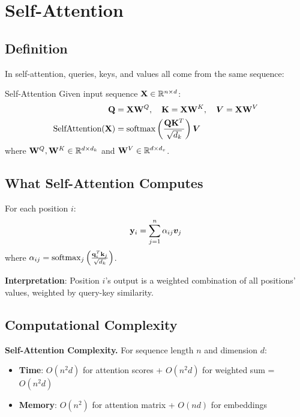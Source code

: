 \section{Self-Attention}
\label{sec:self_attention}

\subsection{Definition}

In self-attention, queries, keys, and values all come from the same sequence:

\begin{mathresult}{Self-Attention}
Given input sequence $\mathbf{X} \in \mathbb{R}^{n \times d}$:
\begin{align}
\mathbf{Q} &= \mathbf{X} \mathbf{W}^Q, \quad \mathbf{K} = \mathbf{X} \mathbf{W}^K, \quad \bm{V} = \mathbf{X} \mathbf{W}^V \\
\text{SelfAttention}(\mathbf{X}) &= \operatorname{softmax}\left(\frac{\mathbf{Q}\mathbf{K}^T}{\sqrt{d_k}}\right)\bm{V}
\end{align}
where $\mathbf{W}^Q, \mathbf{W}^K \in \mathbb{R}^{d \times d_k}$ and $\mathbf{W}^V \in \mathbb{R}^{d \times d_v}$.
\end{mathresult}

\subsection{What Self-Attention Computes}

For each position $i$:
\begin{equation}
\mathbf{y}_i = \sum_{j=1}^n \alpha_{ij} \bm{v}_j
\end{equation}
where $\alpha_{ij} = \operatorname{softmax}_j\left(\frac{\mathbf{q}_i^T \mathbf{k}_j}{\sqrt{d_k}}\right)$.

\textbf{Interpretation}: Position $i$'s output is a weighted combination of all positions' values, weighted by query-key similarity.

\subsection{Computational Complexity}

\textbf{Self-Attention Complexity.}
For sequence length $n$ and dimension $d$:
\begin{itemize}
    \item \textbf{Time}: $O(n^2 d)$ for attention scores + $O(n^2 d)$ for weighted sum = $O(n^2 d)$
    \item \textbf{Memory}: $O(n^2)$ for attention matrix + $O(nd)$ for embeddings
\end{itemize}


